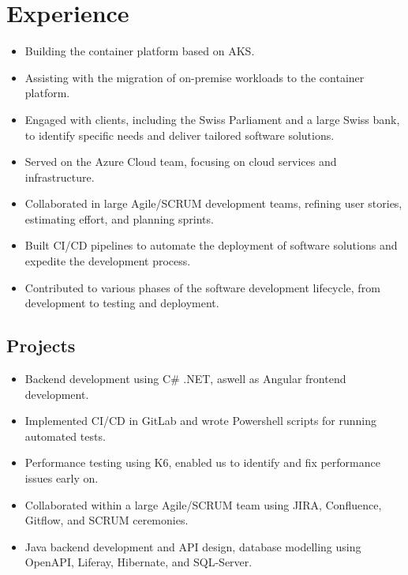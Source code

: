 \section{Experience}
\begin{itemize}
    \item Building the container platform based on AKS.
    \item Assisting with the migration of on-premise workloads to the container platform.
\end{itemize}
\dottedline

\begin{itemize}
    \item Engaged with clients, including the Swiss Parliament and a large Swiss bank, to identify specific needs and deliver tailored software solutions.
    \item Served on the Azure Cloud team, focusing on cloud services and infrastructure.
    \item Collaborated in large Agile/SCRUM development teams, refining user stories, estimating effort, and planning sprints.
    \item Built CI/CD pipelines to automate the deployment of software solutions and expedite the development process.
    \item Contributed to various phases of the software development lifecycle, from development to testing and deployment.
\end{itemize}
\subsection*{Projects}
\begin{itemize}
    \item Backend development using C\# .NET, aswell as Angular frontend development.
    \item Implemented CI/CD in GitLab and wrote Powershell scripts for running automated tests.
    \item Performance testing using K6, enabled us to identify and fix performance issues early on.
\end{itemize}
\dottedline

\begin{itemize}
    \item Collaborated within a large Agile/SCRUM team using JIRA, Confluence, Gitflow, and SCRUM ceremonies.
    \item Java backend development and API design, database modelling using OpenAPI, Liferay, Hibernate, and SQL-Server.
\end{itemize}
\dottedline

